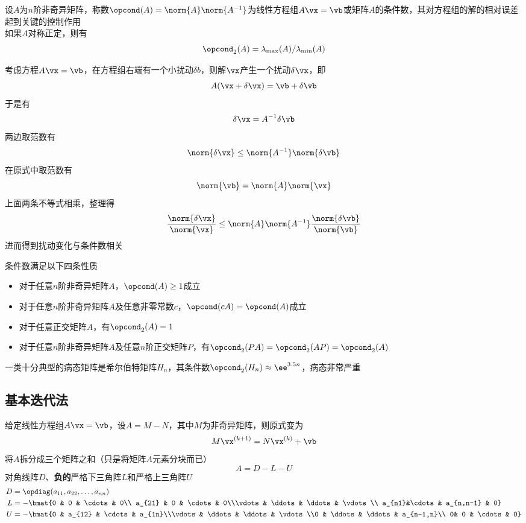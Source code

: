 \begin{definition}[条件数]
    设$A$为$n$阶非奇异矩阵，称数$\opcond(A)=\norm{A}\norm{A^{-1}}$为线性方程组$A\vx=\vb$或矩阵$A$的条件数，其对方程组的解的相对误差起到关键的控制作用\\
    如果$A$对称正定，则有
    \[\opcond_2(A)=\lambda_{\max}(A)/\lambda_{\min}(A)\]
\end{definition}
\begin{analysis}
考虑方程$A\vx=\vb$，在方程组右端有一个小扰动$\delta b$，则解$\vx$产生一个扰动$\delta\vx$，即
\[A(\vx+\delta\vx)=\vb+\delta\vb\]
于是有
\[\delta\vx=A^{-1}\delta\vb\]
两边取范数有
\[\norm{\delta\vx}\leq\norm{A^{-1}}\norm{\delta\vb}\]
在原式中取范数有
\[\norm{\vb}=\norm{A}\norm{\vx}\]
上面两条不等式相乘，整理得
\[\frac{\norm{\delta\vx}}{\norm{\vx}}\leq\norm{A}\norm{A^{-1}}\frac{\norm{\delta\vb}}{\norm{\vb}}\]
进而得到扰动变化与条件数相关
\end{analysis}

条件数满足以下四条性质
\begin{itemize}
    \item 对于任意$n$阶非奇异矩阵$A$，$\opcond(A)\geq 1$成立
    \item 对于任意$n$阶非奇异矩阵$A$及任意非零常数$c$，$\opcond(cA)=\opcond(A)$成立
    \item 对于任意正交矩阵$A$，有$\opcond_2(A)=1$
    \item 对于任意$n$阶非奇异矩阵$A$及任意$n$阶正交矩阵$P$，有$\opcond_2(PA)=\opcond_2(AP)=\opcond_2(A)$
\end{itemize}

一类十分典型的病态矩阵是希尔伯特矩阵$H_n$，其条件数$\opcond_2(H_n)\approx\ee^{3.5n}$，病态非常严重

\subsection{基本迭代法}
给定线性方程组$A\vx=\vb$，设$A=M-N$，其中$M$为非奇异矩阵，则原式变为
\[M\vx^{(k+1)}=N\vx^{(k)}+\vb\]
将$A$拆分成三个矩阵之和（只是将矩阵$A$元素分块而已）
\[A=D-L-U\]
对角线阵$D$、\textbf{负的}严格下三角阵$L$和严格上三角阵$U$
\[\begin{aligned}
    D&=\opdiag(a_{11},a_{22},\ldots,a_{nn})\\
    L&=-\bmat{0 & 0 & \cdots & 0\\ a_{21} & 0 & \cdots & 0\\\vdots & \ddots & \ddots & \vdots\\ a_{n1}&\cdots & a_{n,n-1} & 0}\\
    U&=-\bmat{0 & a_{12} & \cdots & a_{1n}\\\vdots & \ddots & \ddots & \vdots\\0 & \ddots & \ddots & a_{n-1,n}\\ 0& 0 & \cdots & 0}
\end{aligned}\]

